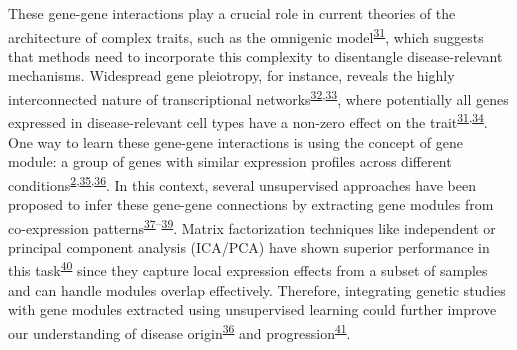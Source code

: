 \documentclass[
  a4paper,
]{article}
\begin{document}
These gene-gene interactions play a crucial role in current theories of the architecture of complex traits, such as the omnigenic model\textsuperscript{\protect\hyperlink{ref-vpIDZCSa}{31}}, which suggests that methods need to incorporate this complexity to disentangle disease-relevant mechanisms.
Widespread gene pleiotropy, for instance, reveals the highly interconnected nature of transcriptional networks\textsuperscript{\protect\hyperlink{ref-pZZn28he}{32},\protect\hyperlink{ref-PDWEwciL}{33}}, where potentially all genes expressed in disease-relevant cell types have a non-zero effect on the trait\textsuperscript{\protect\hyperlink{ref-vpIDZCSa}{31},\protect\hyperlink{ref-LXvTZzEA}{34}}.
One way to learn these gene-gene interactions is using the concept of gene module: a group of genes with similar expression profiles across different conditions\textsuperscript{\protect\hyperlink{ref-CVF61Un5}{2},\protect\hyperlink{ref-jrAMOJCD}{35},\protect\hyperlink{ref-SjGoBywE}{36}}.
In this context, several unsupervised approaches have been proposed to infer these gene-gene connections by extracting gene modules from co-expression patterns\textsuperscript{\protect\hyperlink{ref-S4e4WaP3}{37}--\protect\hyperlink{ref-VzZoy0BD}{39}}.
Matrix factorization techniques like independent or principal component analysis (ICA/PCA) have shown superior performance in this task\textsuperscript{\protect\hyperlink{ref-1BVbSrr6M}{40}} since they capture local expression effects from a subset of samples and can handle modules overlap effectively.
Therefore, integrating genetic studies with gene modules extracted using unsupervised learning could further improve our understanding of disease origin\textsuperscript{\protect\hyperlink{ref-SjGoBywE}{36}} and progression\textsuperscript{\protect\hyperlink{ref-S56q1qoc}{41}}.
\end{document}
